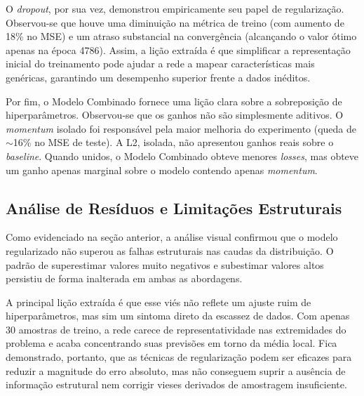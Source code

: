 \documentclass[11pt,a4paper]{article}
\begin{document}
O \textit{dropout}, por sua vez, demonstrou empiricamente seu papel de regularização. Observou-se que houve uma diminuição na métrica de treino (com aumento de 18\% no MSE) e um atraso substancial na convergência (alcançando o valor ótimo apenas na época 4786). Assim, a lição extraída é que simplificar a representação inicial do treinamento pode ajudar a rede a mapear características mais genéricas, garantindo um desempenho superior frente a dados inéditos.

Por fim, o Modelo Combinado fornece uma lição clara sobre a sobreposição de hiperparâmetros. Observou-se que os ganhos não são simplesmente aditivos. O \textit{momentum} isolado foi responsável pela maior melhoria do experimento (queda de $\sim$16\% no MSE de teste). A L2, isolada, não apresentou ganhos reais sobre o \textit{baseline}. Quando unidos, o Modelo Combinado obteve menores \emph{losses}, mas obteve um ganho apenas marginal sobre o modelo contendo apenas \textit{momentum}.

\subsection{Análise de Resíduos e Limitações Estruturais}
Como evidenciado na seção anterior, a análise visual confirmou que o modelo regularizado não superou as falhas estruturais nas caudas da distribuição. O padrão de superestimar valores muito negativos e subestimar valores altos persistiu de forma inalterada em ambas as abordagens. 

A principal lição extraída é que esse viés não reflete um ajuste ruim de hiperparâmetros, mas sim um sintoma direto da escassez de dados. Com apenas 30 amostras de treino, a rede carece de representatividade nas extremidades do problema e acaba concentrando suas previsões em torno da média local. Fica demonstrado, portanto, que as técnicas de regularização podem ser eficazes para reduzir a magnitude do erro absoluto, mas não conseguem suprir a ausência de informação estrutural nem corrigir vieses derivados de amostragem insuficiente.
\end{document}
